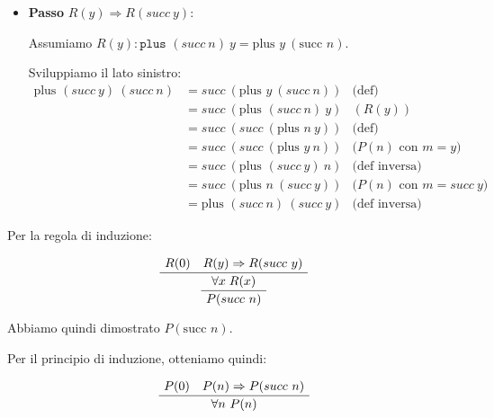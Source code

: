 \documentclass[a4paper,11pt]{report}
\begin{document}
\begin{enumerate}
\begin{itemize}
    \[
    \begin{array}{lll}
         \text{plus } 0 \ (succ \ n) & = succ \ n & \text{(def)} \\
                                           & = succ \ (\text{plus } 0 \ n) & \text{(def )} \\
                                           & = succ \ (\text{plus } n \ 0) & \text{(} P(n) \text{ con } m=0) \\
                                           & = \text{plus } (succ \ n) \ 0 & \text{(def inversa)}
    \end{array}
    \]

    \item \textbf{Passo} $R(y) \Rightarrow R(succ \ y)$:
    
        Assumiamo $R(y): \texttt{plus } (succ \ n) \ y = \text{plus } y \ (\text{succ } n)$.
    
        Sviluppiamo il lato sinistro:
    \[
    \begin{array}{lll}
        \text{plus } (succ \ y) \ (succ \ n) & = succ \ (\text{plus } y \ (succ \ n)) & \text{(def)} \\
        & = succ \ (\text{plus } (succ \ n) \ y) & (R(y)) \\
        & = succ \ (succ \ (\text{plus } n \ y)) & \text{(def)} \\
        & = succ \ (succ \ (\text{plus } y \ n)) & \text{(} P(n) \text{ con } m=y) \\
        & = succ \ (\text{plus } (succ \ y) \ n) & \text{(def inversa)} \\
        & = succ \ (\text{plus } n \ (succ \ y)) & \text{(} P(n) \text{ con } m=succ \ y) \\
        & = \text{plus } (succ \ n) \ (succ \ y) & \text{(def inversa)}
    \end{array}
    \]
\end{itemize}

Per la regola di induzione:

\[ 
    \AxiomC{$R(0) \quad R(y)\Rightarrow R(succ \ y)$}
    \UnaryInfC{$\forall x \; R(x)$}
    \UnaryInfC{$P(succ \ n)$}
    \DisplayProof
\]

Abbiamo quindi dimostrato $P(\text{succ } n)$.

\end{enumerate}
Per il principio di induzione, otteniamo quindi:

\[ 
    \AxiomC{$P(0) \quad P(n)\Rightarrow P(succ \ n)$}
    \UnaryInfC{$\forall n \ P(n)$}
    \DisplayProof
\]
\end{document}
